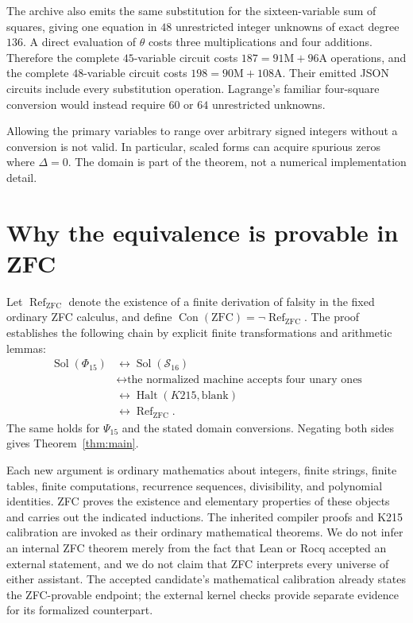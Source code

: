 \documentclass[11pt]{article}
\newcommand{\Con}{\operatorname{Con}}
\newcommand{\Sol}{\operatorname{Sol}}
\theoremstyle{remark}\newtheorem{remark}[theorem]{Remark}
\begin{document}
The archive also emits the same substitution for the sixteen-variable sum of squares, giving one equation in $48$ unrestricted integer unknowns of exact degree $136$. A direct evaluation of $\theta$ costs three multiplications and four additions. Therefore the complete $45$-variable circuit costs $187=91\mathrm M+96\mathrm A$ operations, and the complete $48$-variable circuit costs $198=90\mathrm M+108\mathrm A$. Their emitted JSON circuits include every substitution operation. Lagrange's familiar four-square conversion would instead require $60$ or $64$ unrestricted unknowns.

Allowing the primary variables to range over arbitrary signed integers without a conversion is not valid. In particular, scaled forms can acquire spurious zeros where $\Delta=0$. The domain is part of the theorem, not a numerical implementation detail.

\section{Why the equivalence is provable in ZFC}

Let $\operatorname{Ref}_{\mathrm{ZFC}}$ denote the existence of a finite derivation of falsity in the fixed ordinary ZFC calculus, and define $\Con(\mathrm{ZFC})=\neg\operatorname{Ref}_{\mathrm{ZFC}}$. The proof establishes the following chain by explicit finite transformations and arithmetic lemmas:
\[
\begin{aligned}
 \Sol(\Phi_{15})
 &\longleftrightarrow\Sol(\mathcal S_{16})\\
 &\longleftrightarrow\text{the normalized machine accepts four unary ones}\\
 &\longleftrightarrow\operatorname{Halt}(K215,\mathrm{blank})\\
 &\longleftrightarrow\operatorname{Ref}_{\mathrm{ZFC}}.
\end{aligned}
\]
The same holds for $\Psi_{15}$ and the stated domain conversions. Negating both sides gives Theorem~\ref{thm:main}.

Each new argument is ordinary mathematics about integers, finite strings, finite tables, finite computations, recurrence sequences, divisibility, and polynomial identities. ZFC proves the existence and elementary properties of these objects and carries out the indicated inductions. The inherited compiler proofs and K215 calibration are invoked as their ordinary mathematical theorems. We do not infer an internal ZFC theorem merely from the fact that Lean or Rocq accepted an external statement, and we do not claim that ZFC interprets every universe of either assistant. The accepted candidate's mathematical calibration already states the ZFC-provable endpoint; the external kernel checks provide separate evidence for its formalized counterpart.
\end{document}
